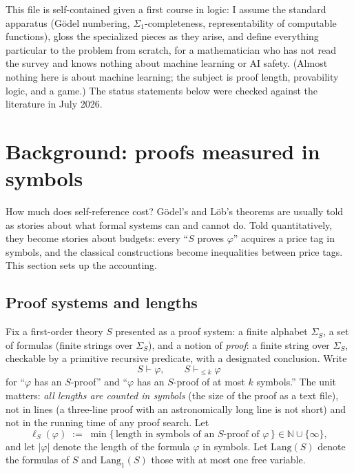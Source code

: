 \documentclass[11pt]{amsart}
\theoremstyle{plain}
\theoremstyle{definition}
\newcommand{\Lang}{\mathrm{Lang}}
\begin{document}
This file is self-contained given a first course in logic: I assume the standard apparatus (G\"odel numbering, $\Sigma_1$-completeness, representability of computable functions), gloss the specialized pieces as they arise, and define everything particular to the problem from scratch, for a mathematician who has not read the survey and knows nothing about machine learning or AI safety. (Almost nothing here is about machine learning; the subject is proof length, provability logic, and a game.) The status statements below were checked against the literature in July 2026.

\section{Background: proofs measured in symbols}
\label{sec:background}

How much does self-reference cost? G\"odel's and L\"ob's theorems are usually told as stories about what formal systems can and cannot do. Told quantitatively, they become stories about budgets: every ``$S$ proves $\varphi$'' acquires a price tag in symbols, and the classical constructions become inequalities between price tags. This section sets up the accounting.

\subsection{Proof systems and lengths}
\label{sec:systems}

Fix a first-order theory $S$ presented as a proof system: a finite alphabet $\Sigma_S$, a set of formulas (finite strings over $\Sigma_S$), and a notion of \emph{proof}: a finite string over $\Sigma_S$, checkable by a primitive recursive predicate, with a designated conclusion. Write
\[
S \vdash \varphi, \qquad S \vdash_{\le k} \varphi
\]
for ``$\varphi$ has an $S$-proof'' and ``$\varphi$ has an $S$-proof of at most $k$ symbols.'' The unit matters: \emph{all lengths are counted in symbols} (the size of the proof as a text file), not in lines (a three-line proof with an astronomically long line is not short) and not in the running time of any proof search. Let
\[
\ell_S(\varphi) \;:=\; \min\{\,\text{length in symbols of an $S$-proof of } \varphi\,\} \in \mathbb{N} \cup \{\infty\},
\]
and let $|\varphi|$ denote the length of the formula $\varphi$ in symbols. Let $\Lang(S)$ denote the formulas of $S$ and $\Lang_1(S)$ those with at most one free variable.
\end{document}
